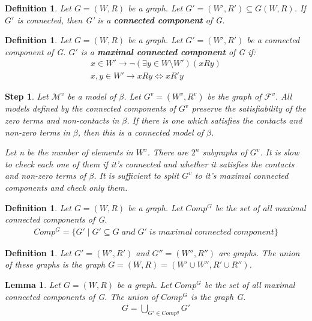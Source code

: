\documentclass{article}
\newcommand\M{\mathcal{M}}
\newcommand\F{\mathcal{F}}
\newtheorem{lemma}[theorem]{Lemma}
\newtheorem{defn}[theorem]{Definition}
\newtheorem{step}[theorem]{Step}
\begin{document}
	\begin{defn}
		Let $G=(W, R)$ be a graph. Let $G'=(W', R') \subseteq G(W, R)$. If $G'$ is connected, then G' is a \textbf{connected component} of G.
	\end{defn}

	\begin{defn}
		Let $G=(W, R)$ be a graph. Let $G'=(W', R')$ be a connected component of G. $G'$ is a \textbf{maximal connected component} of G if:
		\begin{gather*}
			x \in W' \rightarrow \neg(\exists y \in W \setminus W')(xRy) \\
			x,y \in W' \rightarrow xRy \iff xR'y
		\end{gather*}
	\end{defn}

	\begin{step}
		Let $\M^v$ be a model of $\beta$. Let $G^v=(W^v, R^v)$ be the graph of $\F^v$.
		All models defined by the connected components of $G^v$ preserve the satisfiability of the zero terms and non-contacts in $\beta$. If there is one which satisfies the contacts and non-zero terms in $\beta$, then this is a connected model of $\beta$.

		Let n be the number of elements in $W^v$. There are $2^n$ subgraphs of $G^v$. It is slow to check each one of them if it's connected and whether it satisfies the contacts and non-zero terms of $\beta$. It is sufficient to split $G^v$ to it's maximal connected components and check only them.
	\end{step}

	\begin{defn}
		Let $G=(W, R)$ be a graph. Let $Comp^G$ be the set of all maximal connected components of G.
		\begin{gather*}
			Comp^G = \{ G' \mid G' \subseteq G \; and \; G' \; is \; maximal \; connected \; component\}
		\end{gather*}
	\end{defn}

	\begin{defn}
		Let $G'=(W', R')$ and $G''=(W'', R'')$ are graphs. The union of these graphs is the graph $G=(W,R)=(W' \cup W'', R' \cup R'')$.
	\end{defn}

	\begin{lemma}
		Let $G=(W, R)$ be a graph. Let $Comp^G$ be the set of all maximal connected components of G. The union of $Comp^G$ is the graph G.
		\begin{gather*}
			G = \bigcup\limits_{G' \in Comp^g} G'
		\end{gather*}
	\end{lemma}
\end{document}
